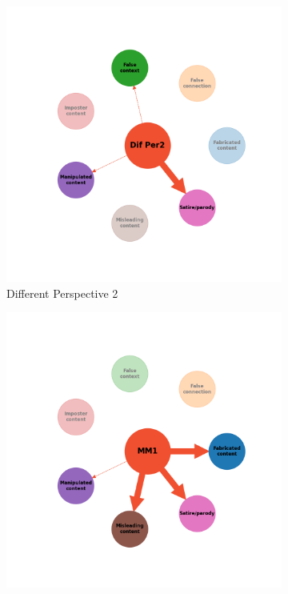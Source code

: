 \documentclass[twocolumn]{article}
\begin{document}
\begin{figure}
\begin{subfigure}{0.28\textwidth}
    \includegraphics[width=\textwidth]{rebuttal_Dif_Per2.png}
    \caption{Different Perspective 2}
    \label{fig:rebuttal_diffper2}
\end{subfigure}
\hfill
\begin{subfigure}{0.28\textwidth}
    \includegraphics[width=\textwidth]{rebuttal_MM1.png}

\end{subfigure}
\end{figure}
\end{document}
